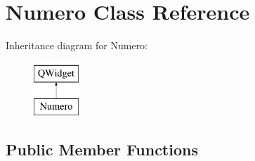 \hypertarget{class_numero}{\section{Numero Class Reference}
\label{class_numero}
}
Inheritance diagram for Numero\-:\begin{figure}[H]
\begin{center}
\leavevmode
\includegraphics[height=2.000000cm]{class_numero}
\end{center}
\end{figure}
\subsection*{Public Member Functions}

